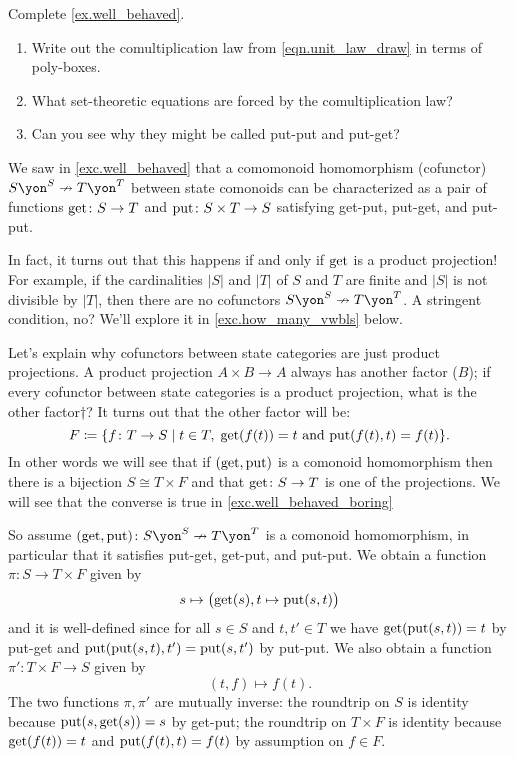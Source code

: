\documentclass[DynamicalBook]{subfiles}
\begin{document}
\begin{exercise}\label{exc.well_behaved}
Complete \cref{ex.well_behaved}.
\begin{enumerate}
	\item Write out the comultiplication law from \eqref{eqn.unit_law_draw} in terms of poly-boxes.
	\item What set-theoretic equations are forced by the comultiplication law?
	\item Can you see why they might be called put-put and put-get?
\qedhere
\end{enumerate}
\end{exercise}

\begin{example}\label{ex.well_behaved_boring}
We saw in \cref{exc.well_behaved} that a comomonoid homomorphism (cofunctor) $S\yon^S\cof T\yon^T$ between state comonoids can be characterized as a pair of functions $\mathrm{get}\colon S\to T$ and $\mathrm{put}\colon S\times T\to S$ satisfying get-put, put-get, and put-put. 

In fact, it turns out that this happens if and only if $\mathrm{get}$ is a product projection! For example, if the cardinalities $|S|$ and $|T|$ of $S$ and $T$ are finite and $|S|$ is not divisible by $|T|$, then there are no cofunctors $S\yon^S\cof T\yon^T$. A stringent condition, no? We'll explore it in  \cref{exc.how_many_vwbls} below.

Let's explain why cofunctors between state categories are just product projections. A product projection $A\times B\to A$ always has another factor ($B$); if every cofunctor between state categories is a product projection, what is the other factor†? It turns out that the other factor will be:
\[
F\coloneqq\{f\colon T\to S\mid t\in T,\;\mathrm{get}(f(t))=t\text{ and }\mathrm{put}(f(t),t)=f(t)\}.
\]
In other words we will see that if $(\mathrm{get},\mathrm{put})$ is a comonoid homomorphism then there is a bijection $S\cong T\times F$ and that $\mathrm{get}\colon S\to T$ is one of the projections. We will see that the converse is true in \cref{exc.well_behaved_boring}

So assume $(\lensget,\lensput)\colon S\yon^S\cof T\yon^T$ is a comonoid homomorphism, in particular that it satisfies put-get, get-put, and put-put. We obtain a function $\pi\colon S\to T\times F$ given by
\[s\mapsto\big(\mathrm{get}(s),t\mapsto\mathrm{put}(s,t)\big)\]
and it is well-defined since for all $s\in S$ and $t,t'\in T$ we have $\mathrm{get}(\mathrm{put}(s,t))=t$ by put-get and $\mathrm{put}(\mathrm{put}(s,t),t')=\mathrm{put}(s,t')$ by put-put. We also obtain a function $\pi'\colon T\times F\to S$ given by
\[
(t,f)\mapsto f(t).
\]
The two functions $\pi,\pi'$ are mutually inverse: the roundtrip on $S$ is identity because $\mathrm{put}(s,\mathrm{get}(s))=s$ by get-put; the roundtrip on $T\times F$ is identity because $\mathrm{get}(f(t))=t$ and $\mathrm{put}(f(t),t)=f(t)$ by assumption on $f\in F$.
\end{example}
\end{document}
